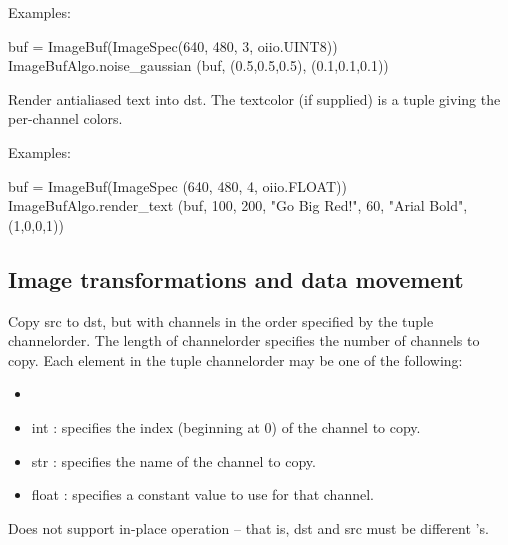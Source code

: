 \smallskip
\noindent Examples:
\begin{code}
    buf = ImageBuf(ImageSpec(640, 480, 3, oiio.UINT8))
    ImageBufAlgo.noise_gaussian (buf, (0.5,0.5,0.5), (0.1,0.1,0.1))
\end{code}
\apiend


 

Render antialiased text into {\cf dst}.  The {\cf textcolor} (if supplied)
is a tuple giving the per-channel colors.

\smallskip
\noindent Examples:
\begin{code}
    buf = ImageBuf(ImageSpec (640, 480, 4, oiio.FLOAT))
    ImageBufAlgo.render_text (buf, 100, 200, "Go Big Red!",
                               60, "Arial Bold", (1,0,0,1))
\end{code}
\apiend



\subsection{Image transformations and data movement}
\label{sec:iba:py:transforms}

 

Copy {\cf src} to {\cf dst}, but with channels in
the order specified by the tuple {\cf channelorder}. 
The length of {\cf channelorder} specifies the number of channels to copy.
Each element in the tuple {\cf channelorder} may be one of the following:
\begin{itemize}
\item {}
\item {\cf int} : specifies the index (beginning at 0) of the channel
    to copy.
\item {\cf str} : specifies the name of the channel to copy.
\item {\cf float} : specifies a constant value to use for that channel.
\end{itemize}

Does not support in-place operation -- that is, {\cf dst} and {\cf src} must
be different \ImageBuf's.

